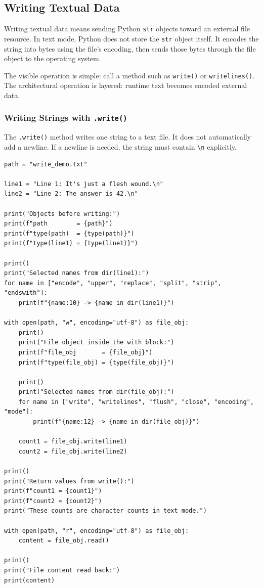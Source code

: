\subsection{Writing Textual Data}

Writing textual data means sending Python \texttt{str} objects toward an external file resource. In text mode, Python does not store the \texttt{str} object itself. It encodes the string into bytes using the file's encoding, then sends those bytes through the file object to the operating system.

The visible operation is simple: call a method such as \texttt{write()} or \texttt{writelines()}. The architectural operation is layered: runtime text becomes encoded external data.

\subsubsection{Writing Strings with \texttt{.write()}}

The \texttt{.write()} method writes one string to a text file. It does not automatically add a newline. If a newline is needed, the string must contain \texttt{\textbackslash n} explicitly.

\begin{verbatim}
path = "write_demo.txt"

line1 = "Line 1: It's just a flesh wound.\n"
line2 = "Line 2: The answer is 42.\n"

print("Objects before writing:")
print(f"path        = {path}")
print(f"type(path)  = {type(path)}")
print(f"type(line1) = {type(line1)}")

print()
print("Selected names from dir(line1):")
for name in ["encode", "upper", "replace", "split", "strip", "endswith"]:
    print(f"{name:10} -> {name in dir(line1)}")

with open(path, "w", encoding="utf-8") as file_obj:
    print()
    print("File object inside the with block:")
    print(f"file_obj       = {file_obj}")
    print(f"type(file_obj) = {type(file_obj)}")

    print()
    print("Selected names from dir(file_obj):")
    for name in ["write", "writelines", "flush", "close", "encoding", "mode"]:
        print(f"{name:12} -> {name in dir(file_obj)}")

    count1 = file_obj.write(line1)
    count2 = file_obj.write(line2)

print()
print("Return values from write():")
print(f"count1 = {count1}")
print(f"count2 = {count2}")
print("These counts are character counts in text mode.")

with open(path, "r", encoding="utf-8") as file_obj:
    content = file_obj.read()

print()
print("File content read back:")
print(content)
\end{verbatim}

